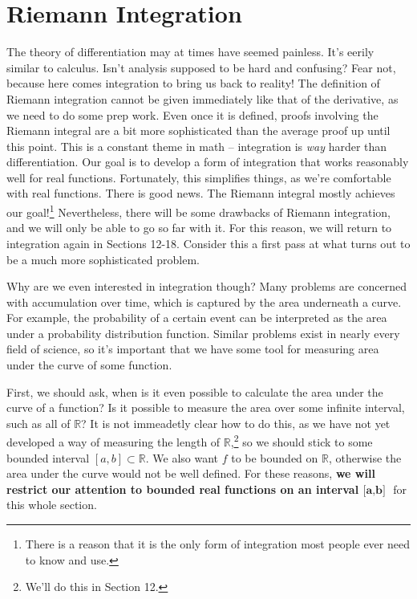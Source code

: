 \documentclass{article}
\newcommand{\R}{\mathbb{R}}
\theoremstyle{definition}
\begin{document}
\section{Riemann Integration}
The theory of differentiation may at times have seemed painless. It's eerily similar to calculus. Isn't analysis supposed to be hard and confusing? Fear not, because here comes integration to bring us back to reality! The definition of Riemann integration cannot be given immediately like that of the derivative, as we need to do some prep work. Even once it is defined, proofs involving the Riemann integral are a bit more sophisticated than the average proof up until this point. This is a constant theme in math -- integration is \textit{way} harder than differentiation. Our goal is to develop a form of integration that works reasonably well for real functions. Fortunately, this simplifies things, as we're comfortable with real functions. There is good news. The Riemann integral mostly achieves our goal!\footnote{There is a reason that it is the only form of integration most people ever need to know and use.} Nevertheless, there will be some drawbacks of Riemann integration, and we will only be able to go so far with it. For this reason, we will return to integration again in Sections 12-18. Consider this a first pass at what turns out to be a much more sophisticated problem. 

Why are we even interested in integration though? Many problems are concerned with accumulation over time, which is captured by the area underneath a curve. For example, the probability of a certain event can be interpreted as the area under a probability distribution function. Similar problems exist in nearly every field of science, so it's important that we have some tool for measuring area under the curve of some function. 

First, we should ask, when is it even possible to calculate the area under the curve of a function? Is it possible to measure the area over some infinite interval, such as all of $ \R $? It is not immeadetly clear how to do this, as we have not yet developed a way of measuring the length of $ \R $,\footnote{We'll do this in Section 12.} so we should stick to some bounded interval $ [a,b]\subset\R $. We also want $ f $ to be bounded on $ \R $, otherwise the area under the curve would not be well defined. For these reasons, \textbf{we will restrict our attention to bounded real functions on an interval $ \textbf{[a,b] }$} for this whole section. 
\end{document}
